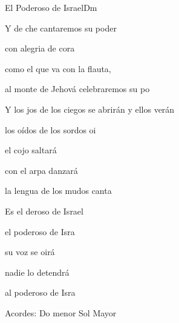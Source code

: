 \documentclass[12pt, spanish]{book}
\begin{document}
\begin{song}{El Poderoso de Israel}{Dm}
        \begin{SBExtraKeys}{




            \begin{SBOpGroup}
                Y de che cantaremos su poder

                con alegria de cora

                como el que va con la flauta,

                al monte de Jehová celebraremos su po
            \end{SBOpGroup}
            \vskip 20pt
            \begin{SBOpGroup}
                Y los jos de los ciegos se abrirán y ellos verán

                los oídos de los sordos oi

                el cojo saltará

                con el arpa danzará

                la lengua de los mudos canta
            \end{SBOpGroup}

            \begin{SBChorus}
                Es el deroso de Israel

                el poderoso de Isra

                su voz se oirá

                nadie lo detendrá

                al poderoso de Isra
            \end{SBChorus}

            \ifChordBk
            \begin{SBOpGroup}
                Acordes:
                \upchord{\Cm}Do menor \hfill
                \upchord{\G}\qquad Sol Mayor \hfill\null\break
            \end{SBOpGroup}
            \fi
        }\end{SBExtraKeys}

        \begin{SBExtraKeys}{

}
\end{SBExtraKeys}
\end{song}
\end{document}
